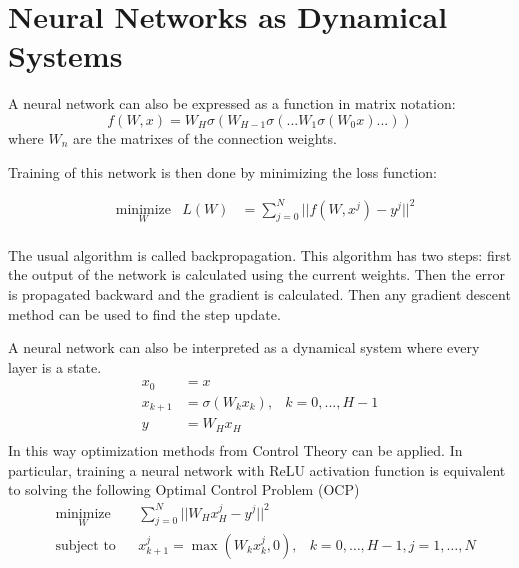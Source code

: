 \newpage
\section{Neural Networks as Dynamical Systems}
A neural network can also be expressed as a function in matrix notation: 
\begin{equation*}
         f(W,x) = W_H\sigma(W_{H-1}\sigma(...W_1\sigma(W_0x)...))
\end{equation*}
where $W_n$ are the matrixes of the connection weights.

Training of this network is then done by minimizing the loss function:

\begin{equation*}
\begin{aligned}
& \underset{W}{\text{minimize}}
& L(W) &= \sum\limits_{j=0}^{N}||f(W,x^j) - y^j||^2 \\
\end{aligned}
\end{equation*}

The usual algorithm is called backpropagation. This algorithm has two steps: first the output of the network is calculated using the current weights. Then the error is propagated backward and the gradient is calculated. Then any gradient descent method can be used to find the step update.

A neural network can also be interpreted as a dynamical system where every layer is a state.
\begin{equation*}
	\begin{aligned}
	x_0 &= x \\
	x_{k+1} &= \sigma(W_kx_k), & k = 0,...,H-1 \\
	y &= W_Hx_H \\
	\end{aligned}
\end{equation*}
In this way optimization methods from Control Theory can be applied. In particular, training a neural network with ReLU activation function is equivalent to solving the following Optimal Control Problem (OCP)
\begin{equation*}
	\begin{aligned}
	& \underset{W}{\text{minimize}}
	& & \sum\limits_{j=0}^{N}||W_Hx_H^j - y^j||^2 \\
	& \text{subject to}
	& & x_{k+1}^j = \max(W_kx_k^j,0), &k = 0,\ldots,H-1,j = 1,\ldots,N
	\end{aligned}
\end{equation*}

